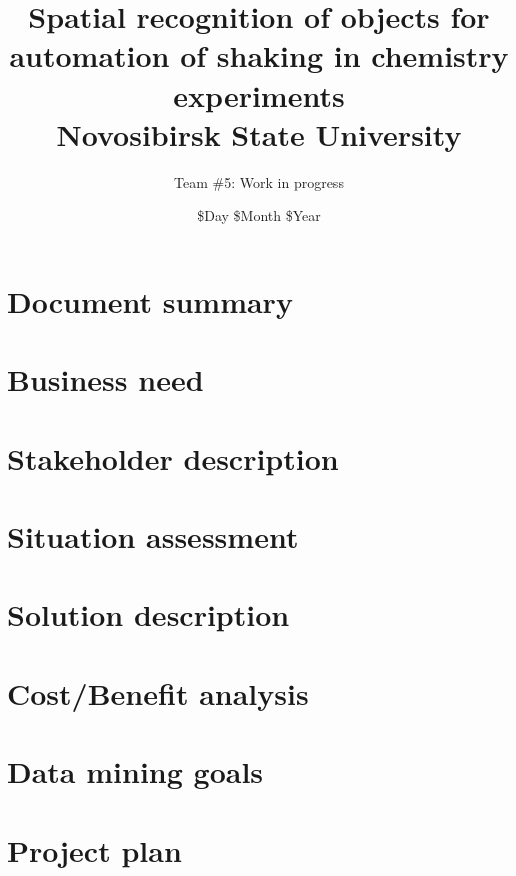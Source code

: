 \documentclass[14pt]{report}
\title{
	{Spatial recognition of objects for automation of shaking in chemistry experiments} \\
	{\large Novosibirsk State University} \\
}
\author{Team \#5: Work in progress}
\date{\$Day \$Month \$Year}
\begin{document}
	
\maketitle
\tableofcontents


\chapter{Document summary}

\thispagestyle{fancy}


\chapter{Business need}

\thispagestyle{fancy}


\chapter{Stakeholder description}

\thispagestyle{fancy}


\chapter{Situation assessment}

\thispagestyle{fancy}


\chapter{Solution description}
\thispagestyle{fancy}


\chapter{Cost/Benefit analysis}

\thispagestyle{fancy}


\chapter{Data mining goals}

\thispagestyle{fancy}


\chapter{Project plan}

\thispagestyle{fancy}

\end{document}
